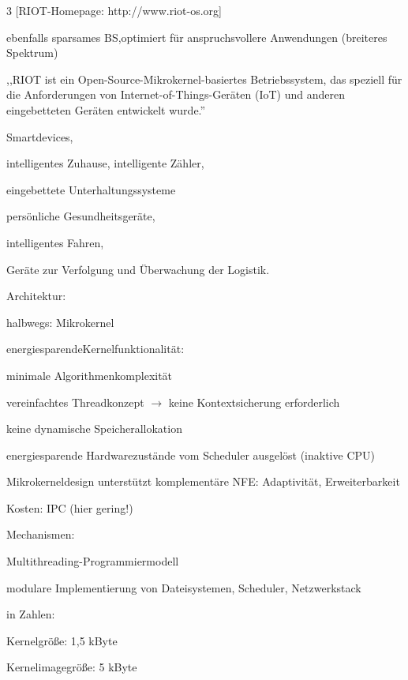 \documentclass[a4paper]{article}
\begin{document}
\begin{multicols}{3}
    [RIOT-Homepage: http://www.riot-os.org]

    \begin{itemize*}
        \item
        ebenfalls sparsames BS,optimiert für anspruchsvollere Anwendungen
        (breiteres Spektrum)
        \item
        ,,RIOT ist ein Open-Source-Mikrokernel-basiertes Betriebssystem, das
        speziell für die Anforderungen von Internet-of-Things-Geräten (IoT)
        und anderen eingebetteten Geräten entwickelt wurde.''
        \begin{itemize*}
            \item Smartdevices,
            \item intelligentes Zuhause, intelligente Zähler,
            \item eingebettete Unterhaltungssysteme
            \item persönliche Gesundheitsgeräte,
            \item intelligentes Fahren,
            \item Geräte zur Verfolgung und Überwachung der Logistik.
        \end{itemize*}
        \item
        Architektur:
        \begin{itemize*}
            \item halbwegs: Mikrokernel
            \item energiesparendeKernelfunktionalität:
            \begin{itemize*}
                \item minimale Algorithmenkomplexität
                \item vereinfachtes Threadkonzept $\rightarrow$ keine Kontextsicherung erforderlich
                \item keine dynamische Speicherallokation
                \item energiesparende Hardwarezustände vom Scheduler ausgelöst (inaktive CPU)
            \end{itemize*}
            \item Mikrokerneldesign unterstützt komplementäre NFE: Adaptivität, Erweiterbarkeit
            \item Kosten: IPC (hier gering!)
        \end{itemize*}
        \item
        Mechanismen:
        \begin{itemize*}
            \item Multithreading-Programmiermodell
            \item modulare Implementierung von Dateisystemen, Scheduler, Netzwerkstack
        \end{itemize*}
        \item
        in Zahlen:
        \begin{itemize*}
            \item Kernelgröße: 1,5 kByte
            \item Kernelimagegröße: 5 kByte
        \end{itemize*}
    \end{itemize*}


\end{multicols}
\end{document}
